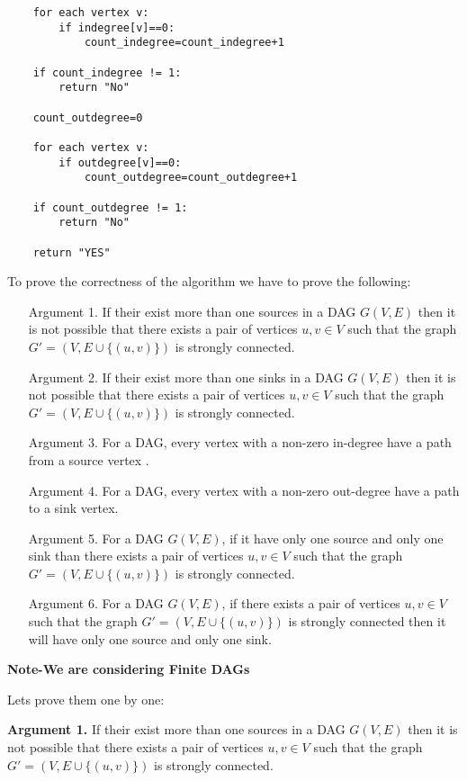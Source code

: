 \documentclass[answers]{exam}
\begin{document}
\begin{questions}
\begin{parts}
\begin{solution}
\begin{verbatim}
    for each vertex v:
        if indegree[v]==0:
            count_indegree=count_indegree+1
    
    if count_indegree != 1:
        return "No"

    count_outdegree=0

    for each vertex v:
        if outdegree[v]==0:
            count_outdegree=count_outdegree+1
    
    if count_outdegree != 1:
        return "No"

    return "YES"
\end{verbatim}

To prove the correctness of the algorithm we have to prove the following:\par
\begin{enumerate}
    \item [Argument 1.] If their exist more than one sources in a DAG $G(V,E)$ then it is not possible that there exists a pair of vertices $u, v \in V$ such that the graph $G' = (V, E \cup \{(u, v)\})$ is strongly connected.
    \item [Argument 2.] If their exist more than one sinks  in a DAG $G(V,E)$ then it is not possible that there exists a pair of vertices $u, v \in V$ such that the graph $G' = (V, E \cup \{(u, v)\})$ is strongly connected.
    \item [Argument 3.] For a DAG, every vertex with a non-zero in-degree have a path from a source vertex .
    \item [Argument 4.] For a DAG, every vertex with a non-zero out-degree have a path to a sink vertex.
    \item [Argument 5.] For a DAG $G(V,E)$, if it have only one source and only one sink than  there exists a pair of vertices $u, v \in V$ such that the graph $G' = (V, E \cup \{(u, v)\})$ is strongly connected.
    \item [Argument 6.] For a DAG $G(V,E)$, if there exists a pair of vertices $u, v \in V$ such that the graph $G' = (V, E \cup \{(u, v)\})$ is strongly connected then it will have only one source and only one sink.
    
\end{enumerate}

\textbf{Note-We are considering Finite DAGs}\par

Lets prove them one by one:

\textbf{Argument 1.} If their exist more than one sources in a DAG $G(V,E)$ then it is not possible that there exists a pair of vertices $u, v \in V$ such that the graph $G' = (V, E \cup \{(u, v)\})$ is strongly connected.



\end{solution}
\end{parts}
\end{questions}
\end{document}

